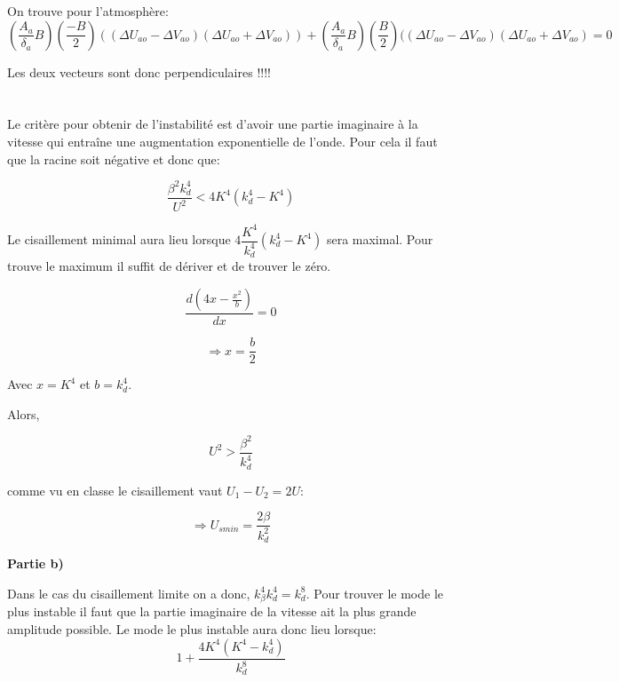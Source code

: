 \documentclass[11pt,a4paper,titlepage]{article}
\begin{document}
On trouve pour l'atmosphère: 
\begin{equation}
(\dfrac{A_a}{\delta_a}  B) \left(\dfrac{-B}{2}\right) ((\Delta U_{ao} - \Delta V_{ao})(\Delta U_{ao} + \Delta V_{ao}) )+\left(\dfrac{A_a}{\delta_a} B\right)\left(\dfrac{B}{2}\right)((\Delta U_{ao} - \Delta V_{ao})(\Delta U_{ao} +\Delta V_{ao}) = 0
\end{equation}


Les deux vecteurs sont donc perpendiculaires !!!!

\pagebreak
 
\section{}

Le critère pour obtenir de l'instabilité est d'avoir une partie imaginaire à la vitesse qui entraîne une augmentation exponentielle de l'onde. Pour cela il faut que la racine soit négative et donc que:

\begin{equation}
\dfrac{\beta^2 k_d^4}{U^2} < 4 K^4 (k_d^4-K^4)
\end{equation}

Le cisaillement minimal aura lieu lorsque $ 4 \dfrac{K^4}{k_d^4 }(k_d^4-K^4)$ sera maximal. Pour trouve le maximum il suffit de dériver et de trouver le zéro.

\begin{equation}
\dfrac{d  (4 x - \frac{x^2}{b})}{d x} = 0
\end{equation}

\begin{equation}
\Rightarrow x = \dfrac{b}{2}
\end{equation}

Avec $x=K^4$ et $b=k_d^4$.

Alors,

\begin{equation}
U^2>\dfrac{\beta^2}{k_d^4}
\end{equation}

comme vu en classe le cisaillement vaut $U_1-U_2 = 2U$:

\begin{equation}
\Rightarrow U_{smin}=\dfrac{2 \beta}{ k_d^2}
\end{equation}

\begin{flushleft}
\textbf{Partie b)}\linebreak
\end{flushleft}
Dans le cas du cisaillement limite on a donc, $k_{\beta}^4k_{d}^4 = k_d^8$. Pour trouver le mode le plus instable il faut que la partie imaginaire de la vitesse ait la plus grande amplitude possible. Le mode le plus instable aura donc lieu lorsque:  
\begin{equation}
1 + \dfrac{4 K^4 (K^4-k_d^4)}{k_d^8}
\end{equation}
\end{document}
